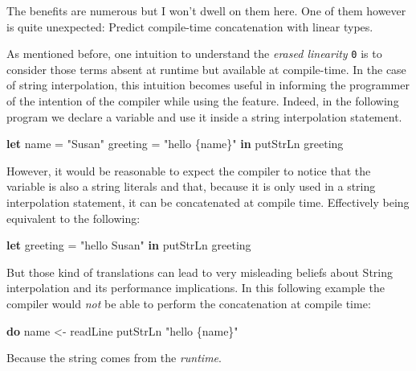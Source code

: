 \documentclass[
]{article}
\newenvironment{Shaded}{}{}
\newcommand{\FunctionTok}[1]{\textcolor[rgb]{0.02,0.16,0.49}{#1}}
\newcommand{\KeywordTok}[1]{\textcolor[rgb]{0.00,0.44,0.13}{\textbf{#1}}}
\newcommand{\NormalTok}[1]{#1}
\newcommand{\OtherTok}[1]{\textcolor[rgb]{0.00,0.44,0.13}{#1}}
\newcommand{\StringTok}[1]{\textcolor[rgb]{0.25,0.44,0.63}{#1}}
\begin{document}
The benefits are numerous but I won't dwell on them here. One of them
however is quite unexpected: Predict compile-time concatenation with
linear types.

As mentioned before, one intuition to understand the \emph{erased
linearity} \texttt{0} is to consider those terms absent at runtime but
available at compile-time. In the case of string interpolation, this
intuition becomes useful in informing the programmer of the intention of
the compiler while using the feature. Indeed, in the following program
we declare a variable and use it inside a string interpolation
statement.

\begin{Shaded}
\begin{Highlighting}[]
\KeywordTok{let}\NormalTok{ name }\OtherTok{=} \StringTok{"Susan"}
\NormalTok{    greeting }\OtherTok{=} \StringTok{"hello \{name\}"} \KeywordTok{in}
    \FunctionTok{putStrLn}\NormalTok{ greeting}
\end{Highlighting}
\end{Shaded}

However, it would be reasonable to expect the compiler to notice that
the variable is also a string literals and that, because it is only used
in a string interpolation statement, it can be concatenated at compile
time. Effectively being equivalent to the following:

\begin{Shaded}
\begin{Highlighting}[]
\KeywordTok{let}\NormalTok{ greeting }\OtherTok{=} \StringTok{"hello Susan"} \KeywordTok{in} 
    \FunctionTok{putStrLn}\NormalTok{ greeting}
\end{Highlighting}
\end{Shaded}

But those kind of translations can lead to very misleading beliefs about
String interpolation and its performance implications. In this following
example the compiler would \emph{not} be able to perform the
concatenation at compile time:

\begin{Shaded}
\begin{Highlighting}[]
\KeywordTok{do}\NormalTok{ name }\OtherTok{\textless{}{-}}\NormalTok{ readLine}
   \FunctionTok{putStrLn} \StringTok{"hello \{name\}"}
\end{Highlighting}
\end{Shaded}

Because the string comes from the \emph{runtime}.
\end{document}
